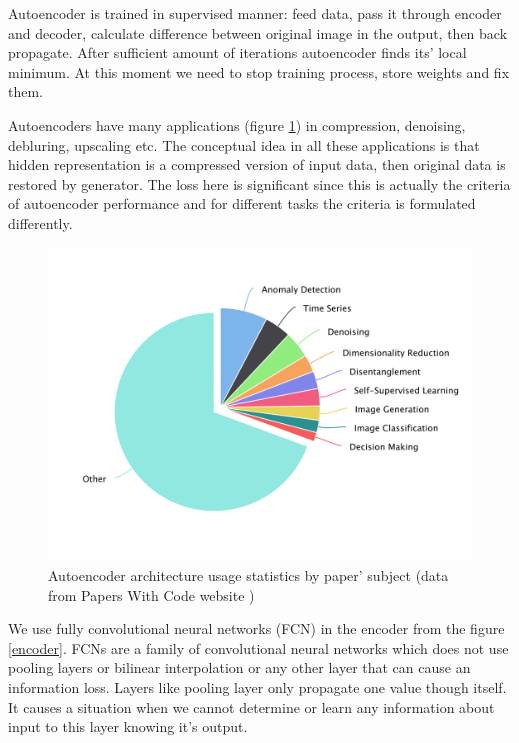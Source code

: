 Autoencoder is trained in supervised manner: feed data, pass it through encoder and decoder, calculate difference between original image in the output, then back propagate. After sufficient amount of iterations autoencoder finds its' local minimum. At this moment we need to stop training process, store weights and fix them.

Autoencoders have many applications (figure \ref{autoencoder-popularity-stats}) in compression, denoising, debluring, upscaling etc. The conceptual idea in all these applications is that hidden representation is a compressed version of input data, then original data is restored by generator. The loss here is significant since this is actually the criteria of autoencoder performance and for different tasks the criteria is formulated differently.

\begin{figure}[!ht]
    \centering
    \includegraphics[width=\textwidth]{figure/autoencoder-popularity-stats.png}
    \caption{Autoencoder architecture usage statistics by paper' subject (data from Papers With Code website \cite{autoencoder_papers})}
    \label{autoencoder-popularity-stats}
\end{figure}

We use fully convolutional neural networks (FCN) in the encoder from the figure \ref{encoder}. FCNs are a family of convolutional neural networks which does not use pooling layers or bilinear interpolation or any other layer that can cause an information loss. Layers like pooling layer only propagate one value though itself. It causes a situation when we cannot determine or learn any information about input to this layer knowing it's output.

